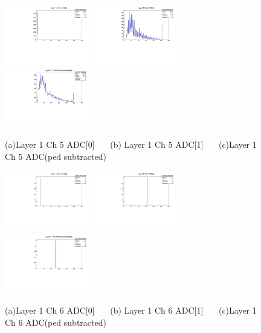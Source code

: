 \documentclass[a4paper,11pt]{article}
\theoremstyle{mytheor}
\begin{document}
\begin{figure}[H] 
\vspace*{-0.3cm} 
\includegraphics[width=0.33\textwidth,scale=0.5,trim=0 0 0 0,clip]{plotsdir/file0_muons-Layer1_Ch5_adc0-1.pdf} 
\includegraphics[width=0.33\textwidth,scale=0.5,trim=0 0 0 0,clip]{plotsdir/file0_muons-Layer1_Ch5_adc1-1.pdf} 
\includegraphics[width=0.33\textwidth,scale=0.5,trim=0 0 0 0,clip]{plotsdir/file0_muons-Layer1_Ch5_adcPedsub-1.pdf} 
\caption{(a)Layer 1 Ch 5 ADC[0] ~~~(b) Layer 1 Ch 5 ADC[1] ~~~(c)Layer 1 Ch 5 ADC(ped subtracted) } 
\end{figure} 
\begin{figure}[H] 
\vspace*{-0.3cm} 
\includegraphics[width=0.33\textwidth,scale=0.5,trim=0 0 0 0,clip]{plotsdir/file0_muons-Layer1_Ch6_adc0-1.pdf} 
\includegraphics[width=0.33\textwidth,scale=0.5,trim=0 0 0 0,clip]{plotsdir/file0_muons-Layer1_Ch6_adc1-1.pdf} 
\includegraphics[width=0.33\textwidth,scale=0.5,trim=0 0 0 0,clip]{plotsdir/file0_muons-Layer1_Ch6_adcPedsub-1.pdf} 
\caption{(a)Layer 1 Ch 6 ADC[0] ~~~(b) Layer 1 Ch 6 ADC[1] ~~~(c)Layer 1 Ch 6 ADC(ped subtracted) } 
\end{figure} 
\end{document}
